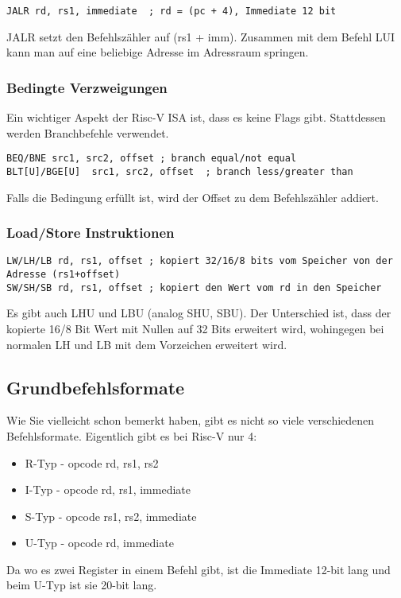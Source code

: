 \begin{lstlisting}
JALR rd, rs1, immediate  ; rd = (pc + 4), Immediate 12 bit
\end{lstlisting}

JALR setzt den Befehlszähler auf (rs1 + imm). Zusammen mit dem Befehl LUI kann
man auf eine beliebige Adresse im Adressraum springen.

\subsubsection{Bedingte Verzweigungen}

Ein wichtiger Aspekt der Risc-V ISA ist, dass es keine Flags gibt. Stattdessen
werden Branchbefehle verwendet.

\begin{lstlisting}
BEQ/BNE src1, src2, offset ; branch equal/not equal
BLT[U]/BGE[U]  src1, src2, offset  ; branch less/greater than
\end{lstlisting}

Falls die Bedingung erfüllt ist, wird der Offset zu dem Befehlszähler addiert.

\subsubsection{Load/Store Instruktionen}

\begin{lstlisting}
LW/LH/LB rd, rs1, offset ; kopiert 32/16/8 bits vom Speicher von der Adresse (rs1+offset)
SW/SH/SB rd, rs1, offset ; kopiert den Wert vom rd in den Speicher
\end{lstlisting}

Es gibt auch LHU und LBU (analog SHU, SBU). Der Unterschied ist, dass der
kopierte 16/8 Bit Wert mit Nullen auf 32 Bits erweitert wird, wohingegen bei normalen LH
und LB mit dem Vorzeichen erweitert wird.

\subsection{Grundbefehlsformate}

Wie Sie vielleicht schon bemerkt haben, gibt es nicht so viele verschiedenen
Befehlsformate. Eigentlich gibt es bei Risc-V nur 4:

\begin{itemize}
\item R-Typ - opcode rd, rs1, rs2
\item I-Typ - opcode rd, rs1, immediate
\item S-Typ - opcode rs1, rs2, immediate
\item U-Typ - opcode rd, immediate
\end{itemize}

Da wo es zwei Register in einem Befehl gibt, ist die Immediate 12-bit lang und
beim U-Typ ist sie 20-bit lang.

